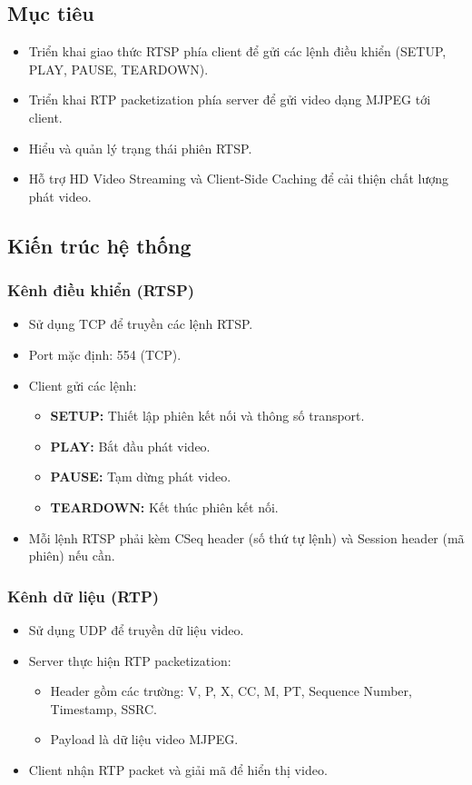 \subsection{Mục tiêu}
\begin{itemize}
    \item Triển khai giao thức RTSP phía client để gửi các lệnh điều khiển (SETUP, PLAY, PAUSE, TEARDOWN).
    \item Triển khai RTP packetization phía server để gửi video dạng MJPEG tới client.
    \item Hiểu và quản lý trạng thái phiên RTSP.
    \item Hỗ trợ HD Video Streaming và Client-Side Caching để cải thiện chất lượng phát video.
\end{itemize}

\subsection{Kiến trúc hệ thống}

\subsubsection{Kênh điều khiển (RTSP)}
\begin{itemize}
    \item Sử dụng TCP để truyền các lệnh RTSP.
    \item Port mặc định: 554 (TCP).
    \item Client gửi các lệnh:
    \begin{itemize}
        \item \textbf{SETUP:} Thiết lập phiên kết nối và thông số transport.
        \item \textbf{PLAY:} Bắt đầu phát video.
        \item \textbf{PAUSE:} Tạm dừng phát video.
        \item \textbf{TEARDOWN:} Kết thúc phiên kết nối.
    \end{itemize}
    \item Mỗi lệnh RTSP phải kèm CSeq header (số thứ tự lệnh) và Session header (mã phiên) nếu cần.
\end{itemize}

\subsubsection{Kênh dữ liệu (RTP)}
\begin{itemize}
    \item Sử dụng UDP để truyền dữ liệu video.
    \item Server thực hiện RTP packetization:
    \begin{itemize}
        \item Header gồm các trường: V, P, X, CC, M, PT, Sequence Number, Timestamp, SSRC.
        \item Payload là dữ liệu video MJPEG.
    \end{itemize}
    \item Client nhận RTP packet và giải mã để hiển thị video.
\end{itemize}

